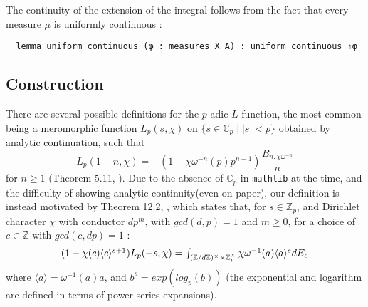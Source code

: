 \documentclass[a4paper,UKenglish,cleveref, autoref, thm-restate]{lipics-v2021}
\newcommand{\lean}[1]{\texttt{#1}\xspace} %
\begin{document}
The continuity of the extension of the integral follows from the fact that every measure $\mu$ is uniformly continuous : 
\begin{lstlisting}
  lemma uniform_continuous (φ : measures X A) : uniform_continuous ⇑φ 
\end{lstlisting}

\subsection{Construction}
There are several possible definitions for the $p$-adic $L$-function, the most common being a meromorphic function $L_p(s, \chi)$ on
\newline $\{ s \in \mathbb{C}_p \mid |s| < p \}$ obtained by analytic continuation, such that
$$ L_p (1 - n, \chi) = -(1 - \chi \omega^{-n}(p)p^{n - 1}) \frac{B_{n, \chi \omega^{-n}}}{n} $$
for $n \ge 1$ (Theorem 5.11, \cite{cyc}). Due to the absence of $\mathbb{C}_p$ in \lean{mathlib} at the time, 
and the difficulty of showing analytic continuity(even on paper), our definition is instead motivated by Theorem 12.2, \cite{cyc}, 
which states that, for $s \in \mathbb{Z}_p$, and Dirichlet character $\chi$ with
conductor $d p^m$, with $gcd (d, p) = 1$ and $m \ge 0$, for a choice of $c \in \mathbb{Z}$
with $gcd (c, dp) = 1$ :
\begin{equation}\label{eqn:2}
  $$ (1 - \chi(c) \langle c \rangle ^{s+1}) L_p(-s, \chi) = \int_{(\mathbb{Z}/d \mathbb{Z})^{\times} \times \mathbb{Z}_p^{\times}}
\chi \omega^{-1}(a) \langle a \rangle ^s dE_c $$
\end{equation}
where $\langle a \rangle  = \omega^{-1}(a) a$, and $b^s = exp (log_p (b))$ (the exponential and logarithm are defined in 
terms of power series expansions).
\end{document}

